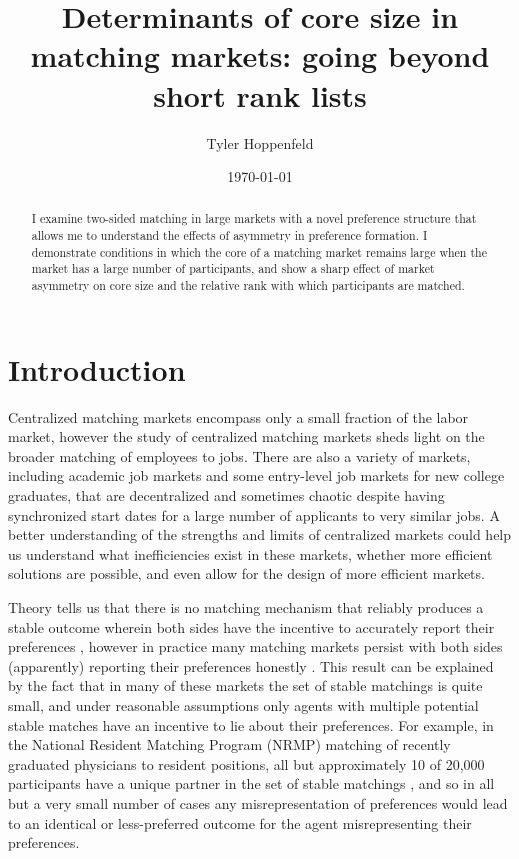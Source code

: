\documentclass[WP]{AEA}
\begin{document}
\title{Determinants of core size in matching markets: going beyond short rank lists}
\author{Tyler Hoppenfeld}
\date{\today}
\JEL{}
\Keywords{}

\begin{abstract}
I examine two-sided matching in large markets with a novel preference structure that allows me to understand the effects of asymmetry in preference formation.  I demonstrate conditions in which the core of a matching market remains large when the market has a large number of participants, and show a sharp effect of market asymmetry on core size and the relative rank with which participants are matched.
\end{abstract}
\maketitle


\section{Introduction}

Centralized matching markets encompass only a small fraction of the labor market, however the study of centralized matching markets  sheds light on the broader matching of employees to jobs. There are also a variety of markets, including academic job markets and some entry-level job markets for new college graduates, that are decentralized and sometimes chaotic despite having synchronized start dates for a large number of applicants to very similar jobs. A better understanding of the strengths and limits of centralized markets could help us understand what inefficiencies exist in these markets, whether more efficient solutions are possible, and even allow for the design of more efficient markets. 

Theory tells us that there is no matching mechanism that reliably produces a stable outcome wherein both sides have the incentive to accurately report their preferences \citep{Roth1985}, however in practice many matching markets persist with both sides (apparently) reporting their preferences honestly  \citep{Roth1991}. This result can be explained by the fact that in many of these markets the set of stable matchings is quite small, and under reasonable assumptions only agents with multiple potential stable matches have an incentive to lie about their preferences.  For example, in the National Resident Matching Program (NRMP) matching of recently graduated physicians to resident positions, all but approximately 10 of 20,000 participants have a unique partner in the set of stable matchings \citep{Roth1999a}, and so in all but a very small number of cases any misrepresentation of preferences would lead to an identical or less-preferred outcome for the agent misrepresenting their preferences. 
\end{document}
